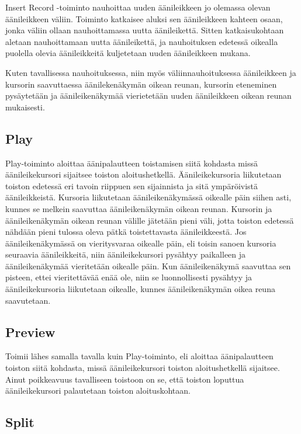 \documentclass[utf8]{gradu3}
\begin{document}
Insert Record -toiminto nauhoittaa uuden äänileikkeen jo olemassa olevan äänileikkeen väliin. Toiminto katkaisee aluksi sen äänileikkeen kahteen osaan, jonka väliin ollaan nauhoittamassa uutta äänileikettä. Sitten katkaisukohtaan aletaan nauhoittamaan uutta äänileikettä, ja nauhoituksen edetessä oikealla puolella olevia äänileikkeitä kuljetetaan uuden äänileikkeen mukana. 

Kuten tavallisessa nauhoituksessa, niin myös väliinnauhoituksessa äänileikkeen ja kursorin saavuttaessa äänilekenäkymän oikean reunan, kursorin eteneminen pysäytetään ja äänileikenäkymää vierietetään uuden äänileikkeen oikean reunan mukaisesti.

\subsection{Play}

Play-toiminto aloittaa äänipalautteen toistamisen siitä kohdasta missä äänileikekursori sijaitsee toiston aloitushetkellä. Äänileikekursoria liikutetaan toiston edetessä eri tavoin riippuen sen sijainnista ja sitä ympäröivistä äänileikkeistä. Kursoria liikutetaan äänileikenäkymässä oikealle päin siihen asti, kunnes se melkein saavuttaa äänileikenäkymän oikean reunan. Kursorin ja äänileikenäkymän oikean reunan välille jätetään pieni väli, jotta toiston edetessä nähdään pieni tulossa oleva pätkä toistettavasta äänileikkeestä. Jos äänileikenäkymässä on vieritysvaraa oikealle päin, eli toisin sanoen kursoria seuraavia äänileikkeitä, niin äänileikekursori pysähtyy paikalleen ja äänileikenäkymää vieritetään oikealle päin. Kun äänileikenäkymä saavuttaa sen pisteen, ettei vieritettävää enää ole, niin se luonnollisesti pysähtyy ja äänileikekursoria liikutetaan oikealle, kunnes äänileikenäkymän oikea reuna saavutetaan.
 

\subsection{Preview}

Toimii lähes samalla tavalla kuin Play-toiminto, eli aloittaa äänipalautteen toiston siitä kohdasta, missä äänileikekursori toiston aloitushetkellä sijaitsee. Ainut poikkeavuus tavalliseen toistoon on se, että toiston loputtua äänileikekursori palautetaan toiston aloituskohtaan. 

\subsection{Split}
\end{document}
